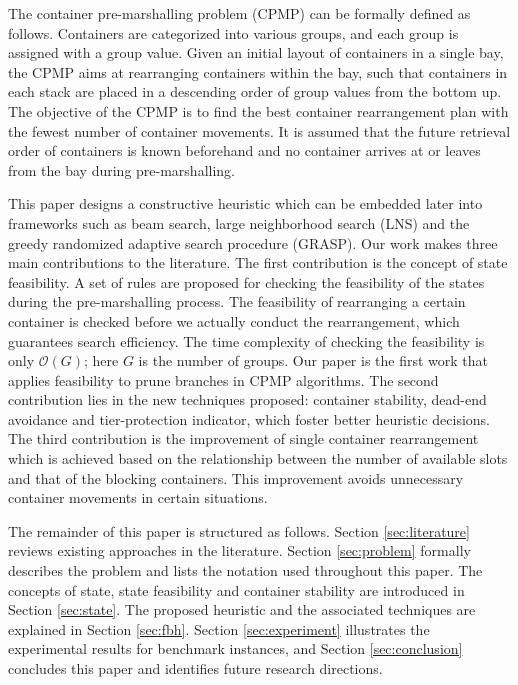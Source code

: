 \documentclass[review,3p,times,12pt,number]{elsarticle}\usepackage{amsmath}\usepackage{amssymb}
\begin{document}
The container pre-marshalling problem (CPMP) can be formally defined as follows. Containers are categorized into various groups, and each group is assigned with a group value. Given an initial layout of containers in a single bay, the CPMP aims at rearranging containers within the bay, such that containers in each stack are placed in a descending order of group values from the bottom up.
The objective of the CPMP is to find the best container rearrangement plan with the fewest number of container movements.
It is assumed that the future retrieval order of containers is known beforehand and no container arrives at or leaves from the bay during pre-marshalling.

This paper designs a constructive heuristic which can be embedded later into frameworks such as beam search, large neighborhood search (LNS) and the greedy randomized adaptive search procedure (GRASP).
Our work makes three main contributions to the literature.
The first contribution is the concept of state feasibility. A set of rules are proposed for checking the feasibility of the states during the pre-marshalling process.
The feasibility of rearranging a certain container is checked before we actually conduct the rearrangement, which guarantees search efficiency.
The time complexity of checking the feasibility is only $\mathcal O(G)$; here $G$ is the number of groups. Our paper is the first work that applies feasibility to prune branches in CPMP algorithms.
The second contribution lies in the new techniques proposed: container stability, dead-end avoidance and tier-protection indicator, which foster better heuristic decisions.
The third contribution is the improvement of single container rearrangement which is achieved based on the relationship between the number of available slots and that of the blocking containers. This improvement avoids unnecessary container movements in certain situations.

The remainder of this paper is structured as follows. Section \ref{sec:literature} reviews existing approaches in the literature. Section \ref{sec:problem} formally describes the problem and lists the notation used throughout this paper. The concepts of state, state feasibility and container stability are introduced in Section \ref{sec:state}.
The proposed heuristic and the associated techniques are explained in Section \ref{sec:fbh}. Section \ref{sec:experiment} illustrates the experimental results for benchmark instances, and Section \ref{sec:conclusion} concludes this paper and identifies future research directions.
\end{document}

